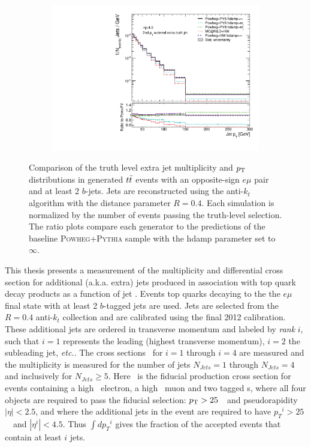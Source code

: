 \begin{figure}
\begin{subfigure}[]{0.45\textwidth}
\end{subfigure} ~
\begin{subfigure}[]{0.45\textwidth}
\includegraphics[width=\textwidth]{fig/MCComp/NLO/TruthPtJet1.pdf}
\end{subfigure}
\caption{Comparison of the truth level extra jet multiplicity and $p_{\text{T}}$ distributions in generated $t\bar{t}$ events with an opposite-sign $e\mu$ pair and at least 2 $b$-jets.  Jets are reconstructed using the anti-$k_t$ algorithm with 
the distance parameter $R=0.4$.
Each simulation is normalized by the number of events passing the truth-level selection.
The ratio plots compare each generator to the predictions of the baseline \textsc{ Powheg+Pythia} sample with the hdamp parameter
set to $\infty$.}
\label{fig:introtjets}
\end{figure}

This thesis presents a measurement of the multiplicity and differential 
cross section for additional (a.k.a. extra) jets produced in 
association with top quark decay products as a function of jet \pT. Events top quarks decaying to the the $e\mu$ final state with at least 2 $b$-tagged jets are used.   Jets are selected from the  $R=0.4$ anti-$k_t$
collection and are calibrated using the final 2012 calibration. These additional jets are ordered 
in transverse momentum and labeled by \textit{rank} $i$, such that $i=1$ represents 
the leading (highest transverse momentum),  $i=2$ the subleading jet, \textit{ etc.}.  The cross sections
\sigmapti\ for $i=1$ through $i=4$ are measured and 
the multiplicity is measured for the number of jets $N_{Jets}=1$ through $N_{Jets}=4$ 
and inclusively for  $N_{Jets}\ge 5$.  Here \sigemubb\ is the fiducial production cross section 
for  events containing a high \pT\ electron, a high \pT\ muon and two tagged \bjet s,
where all four objects are required to pass the fiducial selection:  $p_{\text{T}}>25$~\GeV\ and pseudorapidity $|\eta|<2.5$,
and where the  additional jets in the event are required to have
${p_T}^{i}>25$~\GeV\ and $|\eta^{i}|<4.5$. Thus  $\int$\sigmapti $d{p_T}^{i}$ gives
the fraction of the accepted events that contain at least $i$ jets.

